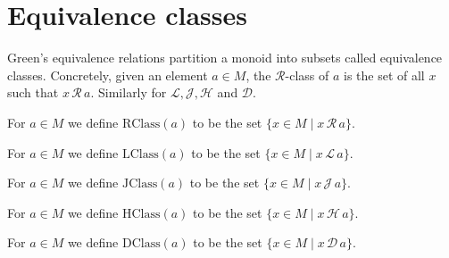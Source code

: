 \section{Equivalence classes}

Green's equivalence relations partition a monoid into subsets called equivalence classes.  Concretely, given an element \(a\in M\), the \(\mathcal R\)-class of \(a\) is the set of all \(x\) such that \(x \,\mathcal R\, a\).  Similarly for \(\mathcal L, \mathcal J, \mathcal H\) and \(\mathcal D\).

\begin{definition}
\label{def:RClass}
For \(a\in M\) we define \(\mathrm{RClass}(a)\) to be the set \(\{x\in M \mid x \,\mathcal R\, a\}\).
\leanok
{}
\end{definition}

\begin{definition}
\label{def:LClass}
For \(a\in M\) we define \(\mathrm{LClass}(a)\) to be the set \(\{x\in M \mid x \,\mathcal L\, a\}\).
\leanok
{}
\end{definition}

\begin{definition}[J class]
\label{def:JClass}
For \(a\in M\) we define \(\mathrm{JClass}(a)\) to be the set \(\{x\in M \mid x \,\mathcal J\, a\}\).
\leanok
{}
\end{definition}

\begin{definition}[H class]
\label{def:HClass}
For \(a\in M\) we define \(\mathrm{HClass}(a)\) to be the set \(\{x\in M \mid x \,\mathcal H\, a\}\).
\leanok
{}
\end{definition}

\begin{definition}[D class]
\label{def:DClass}
For \(a\in M\) we define \(\mathrm{DClass}(a)\) to be the set \(\{x\in M \mid x \,\mathcal D\, a\}\).
\leanok
{}
\end{definition}
